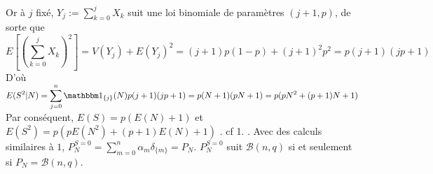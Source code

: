\documentclass{report}
\begin{document}
Or à $j$ fixé, $Y_j:=\sum_{k=0}^j X_k$ suit une loi binomiale de paramètres $(j+1,p)$, de sorte que $$E\left[\left(\sum_{k=0}^j X_k \right)^2 \right] = V\left( Y_j\right) + E(Y_j)^2= (j+1)p(1-p) + (j+1)^2p^2=p(j+1)(jp+1)$$
D'où $\displaystyle E(S^2|N) = \sum_{j=0}^n \mathbbm 1_{\{j\}}(N) p(j+1)(jp+1) = p(N+1)(pN+1)=p(pN^2 + (p+1)N + 1)$\newline 
\newline
Par conséquent, $E(S) =p(E(N)+1)$ et $E(S^2) = p(pE(N^2) + (p+1)E(N) +1)$\newline
{}. cf 1. \newline
{}. Avec des calculs similaires à $1$, $P_N^{S=0}=\sum_{m=0}^n\alpha_m \delta_{\{m\}}=P_N$. $P_N^{S=0}$ suit $\mathcal B(n,q)$ si et seulement si $P_N=\mathcal B(n,q)$.

\newpage
\end{document}
